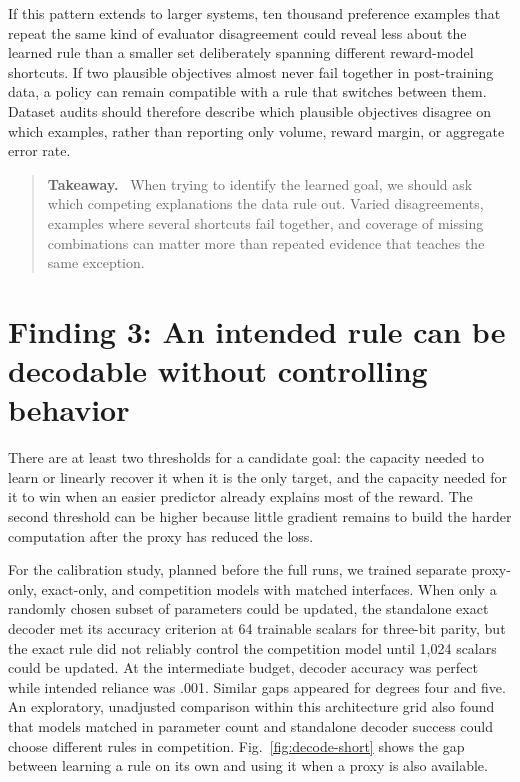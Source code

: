 \documentclass[11pt,a4paper]{article}
\newcommand{\fig}[1]{Fig.~\ref{#1}}
\newenvironment{takeaway}{%
  \begin{quote}\small\color{ink}\noindent\textbf{Takeaway.}\ 
}{%
  \end{quote}
}
\begin{document}
If this pattern extends to larger systems, ten thousand preference examples that repeat the same kind of evaluator disagreement could reveal less about the learned rule than a smaller set deliberately spanning different reward-model shortcuts. If two plausible objectives almost never fail together in post-training data, a policy can remain compatible with a rule that switches between them. Dataset audits should therefore describe which plausible objectives disagree on which examples, rather than reporting only volume, reward margin, or aggregate error rate.

\begin{takeaway}
When trying to identify the learned goal, we should ask which competing explanations the data rule out. Varied disagreements, examples where several shortcuts fail together, and coverage of missing combinations can matter more than repeated evidence that teaches the same exception.
\end{takeaway}

\section*{Finding 3: An intended rule can be decodable without controlling behavior}

There are at least two thresholds for a candidate goal: the capacity needed to learn or linearly recover it when it is the only target, and the capacity needed for it to win when an easier predictor already explains most of the reward. The second threshold can be higher because little gradient remains to build the harder computation after the proxy has reduced the loss.

For the calibration study, planned before the full runs, we trained separate proxy-only, exact-only, and competition models with matched interfaces. When only a randomly chosen subset of parameters could be updated, the standalone exact decoder met its accuracy criterion at 64 trainable scalars for three-bit parity, but the exact rule did not reliably control the competition model until 1,024 scalars could be updated. At the intermediate budget, decoder accuracy was perfect while intended reliance was .001. Similar gaps appeared for degrees four and five. An exploratory, unadjusted comparison within this architecture grid also found that models matched in parameter count and standalone decoder success could choose different rules in competition. \fig{fig:decode-short} shows the gap between learning a rule on its own and using it when a proxy is also available.
\end{document}
